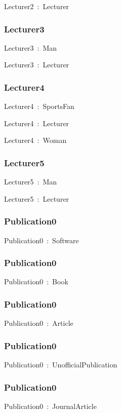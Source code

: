 \documentclass{article}
\begin{document}
Lecturer2~:~Lecturer

\subsubsection*{Lecturer3}

Lecturer3~:~Man

Lecturer3~:~Lecturer

\subsubsection*{Lecturer4}

Lecturer4~:~SportsFan

Lecturer4~:~Lecturer

Lecturer4~:~Woman

\subsubsection*{Lecturer5}

Lecturer5~:~Man

Lecturer5~:~Lecturer

\subsubsection*{Publication0}

Publication0~:~Software

\subsubsection*{Publication0}

Publication0~:~Book

\subsubsection*{Publication0}

Publication0~:~Article

\subsubsection*{Publication0}

Publication0~:~UnofficialPublication

\subsubsection*{Publication0}

Publication0~:~JournalArticle
\end{document}
